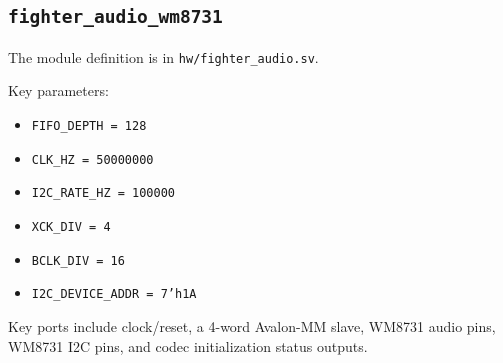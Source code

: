 \documentclass[12pt,a4paper]{article}
\begin{document}
\subsection{\texttt{fighter\_audio\_wm8731}}

The module definition is in \texttt{hw/fighter\_audio.sv}.

Key parameters:

\begin{itemize}
  \item \texttt{FIFO\_DEPTH = 128}
  \item \texttt{CLK\_HZ = 50000000}
  \item \texttt{I2C\_RATE\_HZ = 100000}
  \item \texttt{XCK\_DIV = 4}
  \item \texttt{BCLK\_DIV = 16}
  \item \texttt{I2C\_DEVICE\_ADDR = 7'h1A}
\end{itemize}

Key ports include clock/reset, a 4-word Avalon-MM slave, WM8731 audio pins,
WM8731 I2C pins, and codec initialization status outputs.
\end{document}
